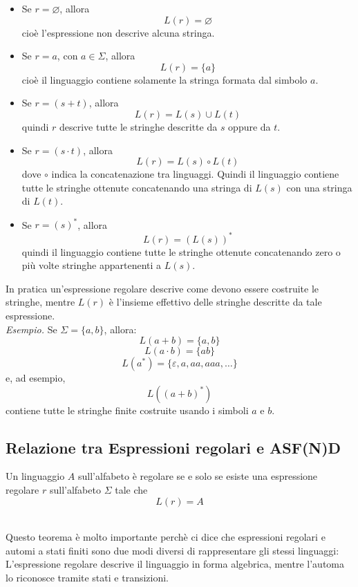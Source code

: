 \begin{itemize}
    \item Se $r = \varnothing$, allora
    \[
    L(r) = \varnothing
    \]
    cioè l'espressione non descrive alcuna stringa.

    \item Se $r = a$, con $a \in \Sigma$, allora
    \[
    L(r) = \{a\}
    \]
    cioè il linguaggio contiene solamente la stringa formata dal simbolo $a$.

    \item Se $r = (s+t)$, allora
    \[
    L(r) = L(s) \cup L(t)
    \]
    quindi $r$ descrive tutte le stringhe descritte da $s$ oppure da $t$.

    \item Se $r = (s \cdot t)$, allora
    \[
    L(r) = L(s) \circ L(t)
    \]
    dove $\circ$ indica la concatenazione tra linguaggi.
    Quindi il linguaggio contiene tutte le stringhe ottenute concatenando
    una stringa di $L(s)$ con una stringa di $L(t)$.

    \item Se $r = (s)^*$, allora
    \[
    L(r) = (L(s))^*
    \]
    quindi il linguaggio contiene tutte le stringhe ottenute concatenando
    zero o più volte stringhe appartenenti a $L(s)$.
\end{itemize}

\noindent In pratica un'espressione regolare descrive come devono essere costruite le stringhe,
mentre $L(r)$ è l'insieme effettivo delle stringhe descritte da tale espressione.\smallskip\\
\textit{Esempio.} Se $\Sigma = \{a,b\}$, allora:
\[
L(a+b) = \{a,b\}
\]
\[
L(a \cdot b) = \{ab\}
\]
\[
L(a^*) = \{\varepsilon, a, aa, aaa, \dots\}
\]
\noindent e, ad esempio,
\[
L((a+b)^*)
\]
contiene tutte le stringhe finite costruite usando i simboli $a$ e $b$.

\newpage

\subsection{Relazione tra Espressioni regolari e ASF(N)D}
\colorbox{SALZO}{\parbox{\dimexpr\linewidth-2\fboxsep}{\begin{theorem}
   Un linguaggio $A$ sull'alfabeto è regolare se e solo se esiste una espressione regolare $r$ sull'alfabeto $\Sigma$
   tale che
   \[  L(r) = A   \]
\end{theorem}}}\smallskip\\
Questo teorema è molto importante perchè ci dice che espressioni regolari e automi a stati finiti sono due 
modi diversi di rappresentare gli stessi linguaggi:
L'espressione regolare descrive il linguaggio in forma algebrica, mentre l'automa lo riconosce tramite stati e 
transizioni.


